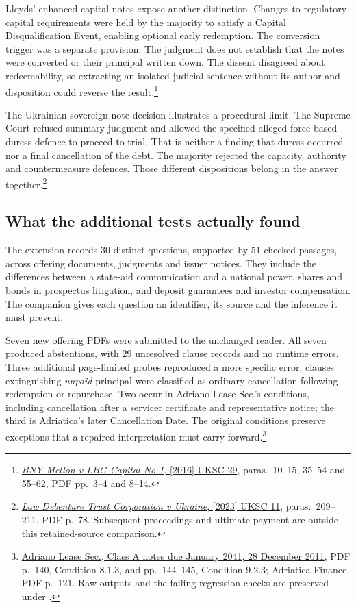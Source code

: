 Lloyds' enhanced capital notes expose another distinction. Changes to
regulatory capital requirements were held by the majority to satisfy a
Capital Disqualification Event, enabling optional early redemption.
The conversion trigger was a separate provision. The judgment does not
establish that the notes were converted or their principal written down.
The dissent disagreed about redeemability, so extracting an isolated
judicial sentence without its author and disposition could reverse the
result.\footnote{
\href{../prospectus/corner-cases-2026-10-04/sources/jur-more-lloyds-generated/source.pdf}
{\emph{BNY Mellon v LBG Capital No 1}, [2016] UKSC 29},
paras.~10--15, 35--54 and 55--62, PDF pp.~3--4 and 8--14.}

The Ukrainian sovereign-note decision illustrates a procedural limit.
The Supreme Court refused summary judgment and allowed the specified
alleged force-based duress defence to proceed to trial. That is neither
a finding that duress occurred nor a final cancellation of the debt.
The majority rejected the capacity, authority and countermeasure defences.
Those different dispositions belong in the answer together.\footnote{
\href{../prospectus/corner-cases-2026-10-04/sources/jur-more-ukraine-judgment/source.pdf}
{\emph{Law Debenture Trust Corporation v Ukraine}, [2023] UKSC 11},
paras.~209--211, PDF p.~78. Subsequent proceedings and ultimate payment
are outside this retained-source comparison.}

\subsection{What the additional tests actually found}

The extension records 30 distinct questions, supported by 51 checked
passages, across offering documents, judgments and issuer notices.
They include the differences between a state-aid communication and a national
power, shares and bonds in prospectus litigation, and deposit guarantees
and investor compensation. The companion gives each question an identifier,
its source and the inference it must prevent.

Seven new offering PDFs were submitted to the unchanged reader. All seven
produced abstentions, with 29 unresolved clause records and no runtime
errors. Three additional page-limited probes reproduced a more specific
error: clauses extinguishing \emph{unpaid} principal were classified as
ordinary cancellation following redemption or repurchase.
Two occur in Adriano Lease Sec.'s conditions, including cancellation after
a servicer certificate and representative notice; the third is Adriatica's
later Cancellation Date. The original conditions preserve exceptions that
a repaired interpretation must carry forward.\footnote{
\href{../prospectus/corner-cases-2026-10-04/sources/jur-more-hypo-1314069/source.pdf}
{Adriano Lease Sec., Class A notes due January 2041,
28 December 2011}, PDF p.~140, Condition 8.1.3, and pp.~144--145,
Condition 9.2.3; Adriatica Finance, PDF p.~121.
Raw outputs and the failing regression checks are preserved under
.}

